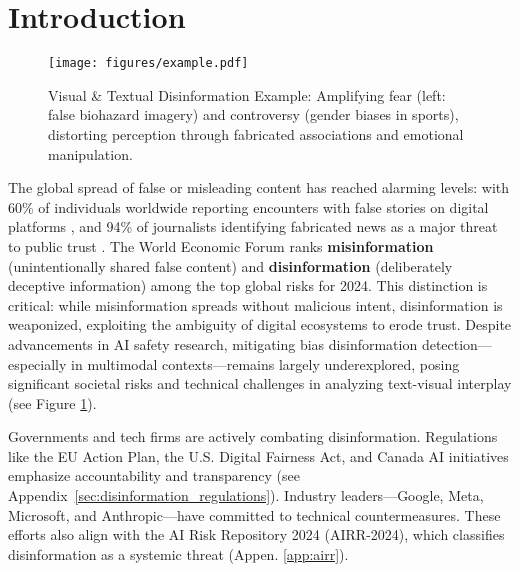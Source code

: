 \section{Introduction}

\begin{figure}[ht]
   \centering
    \texttt{[image: figures/example.pdf]} %
    \caption{Visual \& Textual Disinformation Example: Amplifying fear (left: false biohazard imagery) and controversy (gender biases in sports), distorting perception through fabricated associations and emotional manipulation.}
    \label{fig:multimodal_bias_framework}
\end{figure}

The global spread of false or misleading content has reached alarming levels: with 60\% of individuals worldwide reporting encounters with false stories on digital platforms \cite{RedlineFakeNews2024}, and 94\% of journalists identifying fabricated news as a major threat to public trust \cite{pew2022}. The World Economic Forum \cite{WEF2024GlobalRisks} ranks \textbf{misinformation} (unintentionally shared false content) and \textbf{disinformation} (deliberately deceptive information) among the top global risks for 2024. This distinction is critical: while misinformation spreads without malicious intent, disinformation is weaponized, exploiting the ambiguity of digital ecosystems to erode trust. Despite advancements in AI safety research, mitigating bias disinformation detection—especially in multimodal contexts—remains largely underexplored, posing significant societal risks and technical challenges in analyzing text-visual interplay (see Figure \ref{fig:multimodal_bias_framework}).



Governments and tech firms are actively combating disinformation. Regulations like the EU Action Plan, the U.S. Digital Fairness Act, and Canada AI initiatives emphasize accountability and transparency (see Appendix~\ref{sec:disinformation_regulations}). Industry leaders—Google, Meta, Microsoft, and Anthropic—have committed to technical countermeasures. These efforts also align with the AI Risk Repository 2024 (AIRR-2024), which classifies disinformation as a systemic threat (Appen. \ref{app:airr}).

